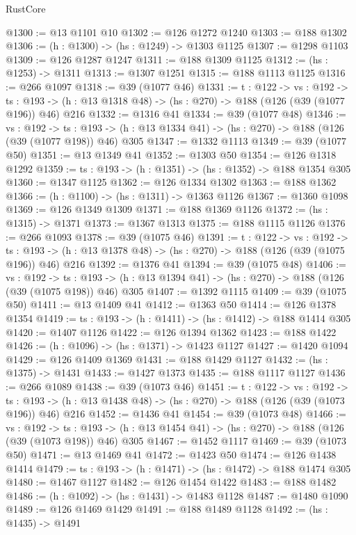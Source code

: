 \begin{lexlean}{RustCore}
\begin{coremodule}
@1300 := @13 @1101 @10
@1302 := @126 @1272 @1240
@1303 := @188 @1302
@1306 := (h : @1300) -> (hs : @1249) -> @1303 @1125
@1307 := @1298 @1103
@1309 := @126 @1287 @1247
@1311 := @188 @1309 @1125
@1312 := (hs : @1253) -> @1311
@1313 := @1307 @1251
@1315 := @188 @1113 @1125
@1316 := @266 @1097
@1318 := @39 (@1077 @46)
@1331 := {t : @122} ->
  {vs : @192} ->
  {ts : @193} -> (h : @13 @1318 @48) -> (hs : @270) -> @188 (@126 (@39 (@1077 @196)) @46) @216
@1332 := @1316 @41
@1334 := @39 (@1077 @48)
@1346 := {vs : @192} ->
  {ts : @193} -> (h : @13 @1334 @41) -> (hs : @270) -> @188 (@126 (@39 (@1077 @198)) @46) @305
@1347 := @1332 @1113
@1349 := @39 (@1077 @50)
@1351 := @13 @1349 @41
@1352 := @1303 @50
@1354 := @126 @1318 @1292
@1359 := {ts : @193} -> (h : @1351) -> (hs : @1352) -> @188 @1354 @305
@1360 := @1347 @1125
@1362 := @126 @1334 @1302
@1363 := @188 @1362
@1366 := (h : @1100) -> (hs : @1311) -> @1363 @1126
@1367 := @1360 @1098
@1369 := @126 @1349 @1309
@1371 := @188 @1369 @1126
@1372 := (hs : @1315) -> @1371
@1373 := @1367 @1313
@1375 := @188 @1115 @1126
@1376 := @266 @1093
@1378 := @39 (@1075 @46)
@1391 := {t : @122} ->
  {vs : @192} ->
  {ts : @193} -> (h : @13 @1378 @48) -> (hs : @270) -> @188 (@126 (@39 (@1075 @196)) @46) @216
@1392 := @1376 @41
@1394 := @39 (@1075 @48)
@1406 := {vs : @192} ->
  {ts : @193} -> (h : @13 @1394 @41) -> (hs : @270) -> @188 (@126 (@39 (@1075 @198)) @46) @305
@1407 := @1392 @1115
@1409 := @39 (@1075 @50)
@1411 := @13 @1409 @41
@1412 := @1363 @50
@1414 := @126 @1378 @1354
@1419 := {ts : @193} -> (h : @1411) -> (hs : @1412) -> @188 @1414 @305
@1420 := @1407 @1126
@1422 := @126 @1394 @1362
@1423 := @188 @1422
@1426 := (h : @1096) -> (hs : @1371) -> @1423 @1127
@1427 := @1420 @1094
@1429 := @126 @1409 @1369
@1431 := @188 @1429 @1127
@1432 := (hs : @1375) -> @1431
@1433 := @1427 @1373
@1435 := @188 @1117 @1127
@1436 := @266 @1089
@1438 := @39 (@1073 @46)
@1451 := {t : @122} ->
  {vs : @192} ->
  {ts : @193} -> (h : @13 @1438 @48) -> (hs : @270) -> @188 (@126 (@39 (@1073 @196)) @46) @216
@1452 := @1436 @41
@1454 := @39 (@1073 @48)
@1466 := {vs : @192} ->
  {ts : @193} -> (h : @13 @1454 @41) -> (hs : @270) -> @188 (@126 (@39 (@1073 @198)) @46) @305
@1467 := @1452 @1117
@1469 := @39 (@1073 @50)
@1471 := @13 @1469 @41
@1472 := @1423 @50
@1474 := @126 @1438 @1414
@1479 := {ts : @193} -> (h : @1471) -> (hs : @1472) -> @188 @1474 @305
@1480 := @1467 @1127
@1482 := @126 @1454 @1422
@1483 := @188 @1482
@1486 := (h : @1092) -> (hs : @1431) -> @1483 @1128
@1487 := @1480 @1090
@1489 := @126 @1469 @1429
@1491 := @188 @1489 @1128
@1492 := (hs : @1435) -> @1491

\end{coremodule}
\end{lexlean}
